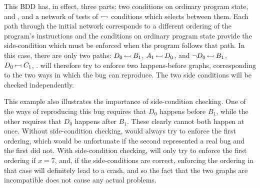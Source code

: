 This BDD has, in effect, three parts: two conditions on ordinary
program state,  and , and a network of tests of
$\leftarrowtail$ conditions which selects between them.  Each path
through the initial network corresponds to a different ordering of the
program's instructions and the conditions on ordinary program state
provide the side-condition which must be enforced when the program
follows that path.  In this case, there are only two paths:
$D_0\,{\leftarrowtail}\,B_1$, $A_1\,{\leftarrowtail}\,D_0$, 
and ${\neg}D_0\,{\leftarrowtail}\,B_1$, $D_0\,{\leftarrowtail}\,C_1$,
.  {\Technique} will therefore try to enforce two
happens-before graphs, corresponding to the two ways in which the bug
can reproduce.  The two side conditions will be checked independently.

This example also illustrates the importance of side-condition
checking.  One of the ways of reproducing this bug requires that $D_0$
happens before $B_1$, while the other requires that $D_0$ happens
after $B_1$.  These clearly cannot both happen at once.  Without
side-condition checking, {\technique} would always try to enforce the
first ordering, which would be unfortunate if the second represented a
real bug and the first did not.  With side-condition checking,
{\technique} will only try to enforce the first ordering if $x = 7$,
and, if the side-conditions are correct, enforcing the ordering in
that case will definitely lead to a crash, and so the fact that the
two graphs are incompatible does not cause any actual problems.

